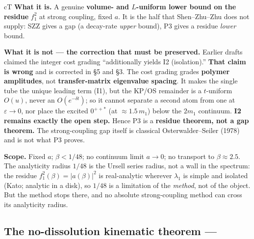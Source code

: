 \begin{claimbox}{cT}
\smallskip
\textbf{What it is.} A genuine \textbf{volume- and $L$-uniform lower bound on the residue}
$f_1^2$ at strong coupling, fixed $a$. It is the half that Shen--Zhu--Zhu does not supply: SZZ
gives a gap (a decay-rate \emph{upper} bound), P3 gives a residue \emph{lower} bound.

\smallskip
\textbf{What it is not --- the correction that must be preserved.} Earlier drafts claimed the
integer cost grading ``additionally yields I2 (isolation).'' \textbf{That claim is wrong} and is
corrected in  \S5 and  \S3. The cost grading
grades \textbf{polymer amplitudes}, not \textbf{transfer-matrix eigenvalue spacing}. It makes
the single tube the unique leading term (I1), but the KP/OS remainder is a $t$-uniform $O(u)$,
never an $O(e^{-\delta t})$; so it cannot separate a second atom from one at $\varepsilon\to0$,
nor place the excited $0^{++*}$ (at $\approx1.5\,m_1$) below the $2m_1$ continuum. \textbf{I2
remains exactly the open step.} Hence P3 is a \textbf{residue theorem, not a gap theorem.} The
strong-coupling gap itself is classical Osterwalder--Seiler (1978) and is not what P3 proves.

\smallskip
\textbf{Scope.} Fixed $a$; $\beta<1/48$; no continuum limit $a\to0$; no transport to
$\beta\approx2.5$. The analyticity radius $1/48$ is the Ursell series radius, not a wall in the
spectrum: the residue $f_1^2(\beta)=|a(\beta)|^2$ is real-analytic wherever $\lambda_1$ is
simple and isolated (Kato; analytic in a disk), so $1/48$ is a limitation of the \emph{method},
not of the object. But the method stops there, and no absolute strong-coupling method can cross
its analyticity radius.
\end{claimbox}

\subsection{The no-dissolution kinematic theorem --- \LC}
\label{sec:nodiss}


